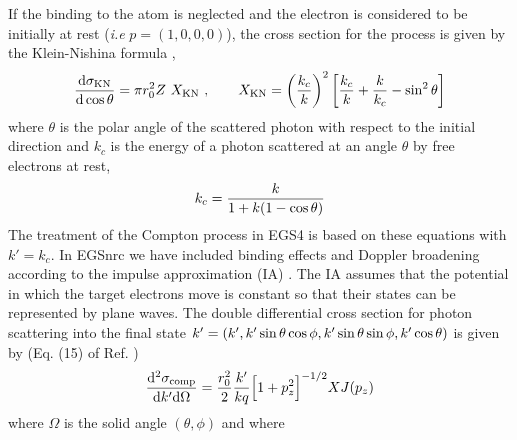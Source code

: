 If the binding to the atom is neglected and the electron 
is considered to be initially at rest ({\em i.e} $p = (1,0,0,0)$), 
the cross section for the process is given by the Klein-Nishina 
formula \cite{KN29},
\begin{equation}
{{\rm d} \sigma_{\rm KN} \over {\rm d} \cos \theta} = \pi r_0^2 Z~ 
X_{\rm KN}~, \quad \quad X_{\rm KN} = 
\left({k_c \over k} \right)^2 
\left[ {k_c \over k} + {k \over k_c} - \sin^2 \theta \right]
\end{equation}
where $\theta$ is the polar angle of the scattered photon with 
respect to the initial direction and $k_c$ is the energy 
of a photon scattered at an angle $\theta$ 
by free electrons at rest,
\begin{equation}
k_c = {k \over 1 + k (1 - \cos \theta)}
\end{equation}
The treatment of the Compton process in EGS4 is based on these 
equations with $k' = k_c$. In EGSnrc we have included binding effects and 
Doppler broadening according to the impulse approximation (IA)
\cite{Ri75}. The IA assumes that the potential in which the 
target electrons move is constant so that their states can 
be represented by plane waves. The double differential 
cross section for photon scattering into the final state 
$k' = (k', k' \sin \theta \cos \phi, k' \sin \theta \sin \phi, \\
k' \cos \theta)$ is given by (Eq. (15) of Ref. \cite{RB82})
\begin{equation}
\label{comp_cs1}
{{\rm d}^2 \sigma_{\rm comp} \over {\rm d}k' {\rm d}\Omega} = 
{r_0^2 \over 2} {k' \over k q} \Big[1 + p_z^2 \Big]^{-1/2} X J(p_z)
\end{equation} 
where $\Omega$ is the solid angle $(\theta,\phi)$ and where
